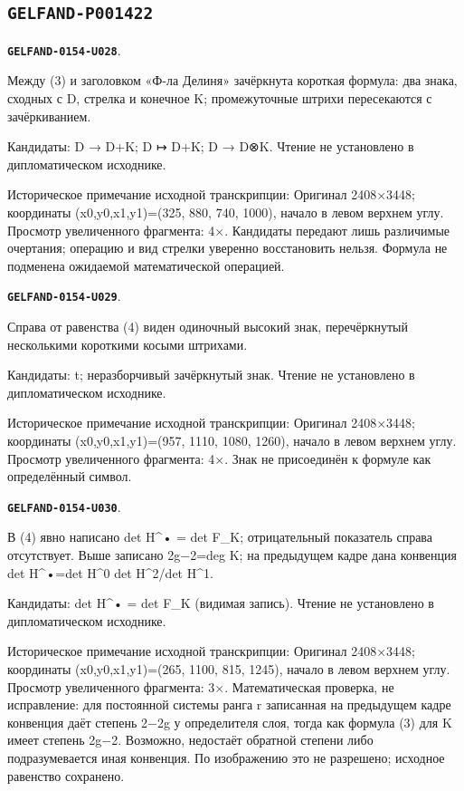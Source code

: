 \documentclass[11pt]{article}
\theoremstyle{definition}
\theoremstyle{remark}
\begin{document}
\subsection*{\texttt{GELFAND-P001422}}
\par\noindent\leavevmode{}\label{GELFAND-0154-U028}\label{GELFAND-P001422:cancelled-divisor-map:note}\textbf{\texttt{GELFAND-0154-U028}}.\nopagebreak[4]\par
Между (3) и заголовком «Ф-ла Делиня» зачёркнута короткая формула: два знака, сходных с D, стрелка и конечное K; промежуточные штрихи пересекаются с зачёркиванием.\par
Кандидаты: D → D+K; D ↦ D+K; D → D⊗K. Чтение не установлено в дипломатическом исходнике.\par
Историческое примечание исходной транскрипции: Оригинал 2408×3448; координаты (x0,y0,x1,y1)=(325, 880, 740, 1000), начало в левом верхнем углу. Просмотр увеличенного фрагмента: 4×. Кандидаты передают лишь различимые очертания; операцию и вид стрелки уверенно восстановить нельзя. Формула не подменена ожидаемой математической операцией.\par\medskip
\par\noindent\leavevmode{}\label{GELFAND-0154-U029}\label{GELFAND-P001422:eq4-cancelled-sign:note}\textbf{\texttt{GELFAND-0154-U029}}.\nopagebreak[4]\par
Справа от равенства (4) виден одиночный высокий знак, перечёркнутый несколькими короткими косыми штрихами.\par
Кандидаты: t; неразборчивый зачёркнутый знак. Чтение не установлено в дипломатическом исходнике.\par
Историческое примечание исходной транскрипции: Оригинал 2408×3448; координаты (x0,y0,x1,y1)=(957, 1110, 1080, 1260), начало в левом верхнем углу. Просмотр увеличенного фрагмента: 4×. Знак не присоединён к формуле как определённый символ.\par\medskip
\par\noindent\leavevmode{}\label{GELFAND-0154-U030}\label{GELFAND-P001422:eq4-determinant-convention:note}\textbf{\texttt{GELFAND-0154-U030}}.\nopagebreak[4]\par
В (4) явно написано det H\textasciicircum{}• = det F\_K; отрицательный показатель справа отсутствует. Выше записано 2g−2=deg K; на предыдущем кадре дана конвенция det H\textasciicircum{}•=det H\textasciicircum{}0 det H\textasciicircum{}2/det H\textasciicircum{}1.\par
Кандидаты: det H\textasciicircum{}• = det F\_K (видимая запись). Чтение не установлено в дипломатическом исходнике.\par
Историческое примечание исходной транскрипции: Оригинал 2408×3448; координаты (x0,y0,x1,y1)=(265, 1100, 815, 1245), начало в левом верхнем углу. Просмотр увеличенного фрагмента: 3×. Математическая проверка, не исправление: для постоянной системы ранга r записанная на предыдущем кадре конвенция даёт степень 2−2g у определителя слоя, тогда как формула (3) для K имеет степень 2g−2. Возможно, недостаёт обратной степени либо подразумевается иная конвенция. По изображению это не разрешено; исходное равенство сохранено.\par\medskip
\end{document}
